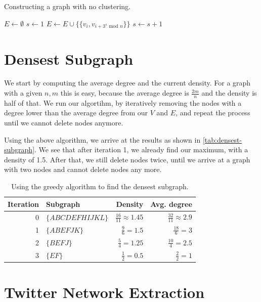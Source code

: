 \documentclass[a4paper,10pt,hidelinks]{article}
\begin{document}
\begin{algorithm}
	\caption{Constructing a graph with no clustering.}
	\label{algo:algo-no-clustering}

	\begin{algorithmic}
		\State $E \gets \emptyset$
		\State $s \gets 1$
		\State $E \gets E \cup \{\{v_i, v_{i + 3^s \text{ mod } n} \}\}$
		\EndFor
		\State $s \gets s + 1$
		\EndWhile
	\end{algorithmic}

\end{algorithm}

\section{Densest Subgraph}

We start by computing the average degree and the current density. For a graph with a given $n, m$ this is easy, because the average degree is $\frac{2m}{n}$ and the density is half of that. We run our algortihm, by iteratively removing the nodes with a degree lower than the average degree from our $V$ and $E$, and repeat the process until we cannot delete nodes anymore.

Using the above algorithm, we arrive at the results as shown in \autoref{tab:densest-subgraph}. We see that after iteration 1, we already find our maximum, with a density of 1.5. After that, we still delete nodes twice, until we arrive at a graph with two nodes and cannot delete nodes any more.

\begin{table}
	\centering
	\begin{tabular}{r || l | r | r}
		Iteration & Subgraph & Density & Avg. degree\\
		\hline
		0   & $\{A B C D E F H I J K L\}$ & $\frac{16}{11} \approx 1.45 $ & $\frac{32}{11} \approx 2.9 $ \\
		1   & $\{A B E F J K\}$ & $ \frac{9}{6} = 1.5 $ & $ \frac{18}{6} = 3 $ \\
		2   & $\{B E F J\}$ & $\frac{5}{4} = 1.25$ & $\frac{10}{4} = 2.5$ \\
		3   & $\{E F\}$ & $\frac{1}{2} = 0.5$ & $\frac{2}{2} = 1$
	\end{tabular}
	\caption{Using the greedy algorithm to find the densest subgraph.}
	\label{tab:densest-subgraph}
\end{table}

\section{Twitter Network Extraction}
\end{document}
